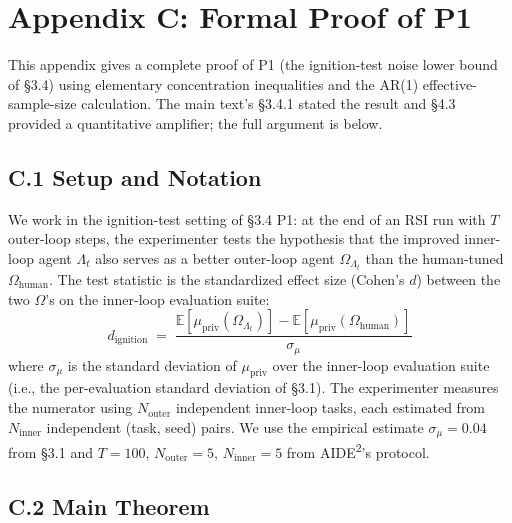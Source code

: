 
\section*{Appendix C: Formal Proof of P1}

This appendix gives a complete proof of P1 (the ignition-test noise lower bound of \S3.4) using elementary concentration inequalities and the AR(1) effective-sample-size calculation. The main text's \S3.4.1 stated the result and \S4.3 provided a quantitative amplifier; the full argument is below.

\subsection*{C.1 Setup and Notation}

We work in the ignition-test setting of \S3.4 P1: at the end of an RSI run with $T$ outer-loop steps, the experimenter tests the hypothesis that the improved inner-loop agent $\Lambda_t$ also serves as a better outer-loop agent $\Omega_{\Lambda_t}$ than the human-tuned $\Omega_{\text{human}}$. The test statistic is the standardized effect size (Cohen's $d$) between the two $\Omega$'s on the inner-loop evaluation suite:
\[
d_{\text{ignition}} \;=\; \frac{\mathbb{E}[\mu_{\text{priv}}(\Omega_{\Lambda_t})] - \mathbb{E}[\mu_{\text{priv}}(\Omega_{\text{human}})]}{\sigma_\mu}
\]
where $\sigma_\mu$ is the standard deviation of $\mu_{\text{priv}}$ over the inner-loop evaluation suite (i.e., the per-evaluation standard deviation of \S3.1). The experimenter measures the numerator using $N_{\text{outer}}$ independent inner-loop tasks, each estimated from $N_{\text{inner}}$ independent (task, seed) pairs. We use the empirical estimate $\sigma_\mu = 0.04$ from \S3.1 and $T = 100$, $N_{\text{outer}} = 5$, $N_{\text{inner}} = 5$ from AIDE\textsuperscript{2}'s protocol.

\subsection*{C.2 Main Theorem}

